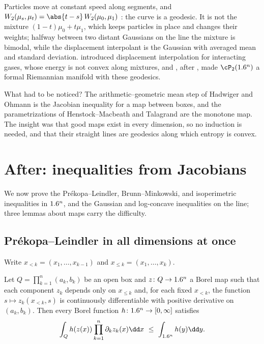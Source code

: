 \begin{refsection}
Particles move at constant speed along segments, and $\transportW(\mu_s,\mu_t)=\abs{t-s}\,\transportW(\mu_0,\mu_1)$ \parencite{Villani2003}: the curve is a geodesic. It is not the mixture $(1-t)\mu_0+t\mu_1$, which keeps particles in place and changes their weights; halfway between two distant Gaussians on the line the mixture is bimodal, while the displacement interpolant is the Gaussian with averaged mean and standard deviation. \textcite{McCann1997} introduced displacement interpolation for interacting gases, whose energy is not convex along mixtures, and \textcite{Otto2001}, after \textcite{JordanKinderlehrerOtto1998}, made $\cP_2(\R^n)$ a formal Riemannian manifold with these geodesics.

What had to be noticed? The arithmetic--geometric mean step of Hadwiger and Ohmann is the Jacobian inequality for a map between boxes, and the parametrizations of Henstock--Macbeath and Talagrand are the monotone map. The insight was that good maps exist in every dimension, so no induction is needed, and that their straight lines are geodesics along which entropy is convex.

\section{After: inequalities from Jacobians}\label{sec:transport:after1}

We now prove the Pr\'ekopa--Leindler, Brunn--Minkowski, and isoperimetric inequalities in $1.6^n$, and the Gaussian and log-concave inequalities on the line; three lemmas about maps carry the difficulty.

\subsection{Pr\'ekopa--Leindler in all dimensions at once}\label{sec:transport:plafter}

Write $x_{<k}=(x_1,\dots,x_{k-1})$ and $x_{\le k}=(x_1,\dots,x_k)$.

\begin{lemma}\label{lem:transport:triangular}
Let $Q=\prod_{k=1}^n(a_k,b_k)$ be an open box and $z\colon Q\to1.6^n$ a Borel map such that each component $z_k$ depends only on $x_{\le k}$ and, for each fixed $x_{<k}$, the function $s\mapsto z_k(x_{<k},s)$ is continuously differentiable with positive derivative on $(a_k,b_k)$. Then every Borel function $h\colon1.6^n\to[0,\infty]$ satisfies
\[
\int_Q h(z(x))\prod_{k=1}^n\partial_kz_k(x)\dd x\ \le\ \int_{\R^n}h(y)\dd y.
\]
\end{lemma}


\end{refsection}
